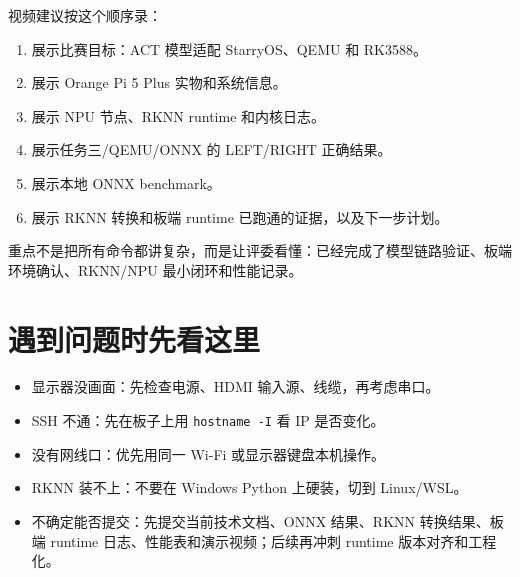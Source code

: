 \documentclass[UTF8,a4paper,11pt]{ctexart}
\begin{document}
视频建议按这个顺序录：

\begin{enumerate}
  \item 展示比赛目标：ACT 模型适配 StarryOS、QEMU 和 RK3588。
  \item 展示 Orange Pi 5 Plus 实物和系统信息。
  \item 展示 NPU 节点、RKNN runtime 和内核日志。
  \item 展示任务三/QEMU/ONNX 的 LEFT/RIGHT 正确结果。
  \item 展示本地 ONNX benchmark。
  \item 展示 RKNN 转换和板端 runtime 已跑通的证据，以及下一步计划。
\end{enumerate}

重点不是把所有命令都讲复杂，而是让评委看懂：已经完成了模型链路验证、板端环境确认、RKNN/NPU 最小闭环和性能记录。

\section{遇到问题时先看这里}

\begin{itemize}
  \item 显示器没画面：先检查电源、HDMI 输入源、线缆，再考虑串口。
  \item SSH 不通：先在板子上用 \verb|hostname -I| 看 IP 是否变化。
  \item 没有网线口：优先用同一 Wi-Fi 或显示器键盘本机操作。
  \item RKNN 装不上：不要在 Windows Python 上硬装，切到 Linux/WSL。
  \item 不确定能否提交：先提交当前技术文档、ONNX 结果、RKNN 转换结果、板端 runtime 日志、性能表和演示视频；后续再冲刺 runtime 版本对齐和工程化。
\end{itemize}
\end{document}
